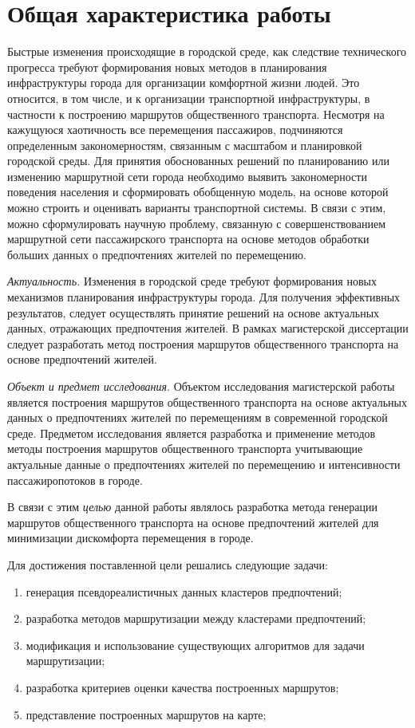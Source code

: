\section{Общая характеристика работы}
Быстрые изменения происходящие в городской среде, как следствие технического прогресса требуют формирования 
новых методов в планирования инфраструктуры города для организации комфортной жизни людей. Это относится, в 
том числе, и к организации транспортной инфраструктуры, в частности к построению маршрутов общественного 
транспорта. Несмотря на кажущуюся хаотичность все перемещения пассажиров, подчиняются определенным 
закономерностям, связанным с масштабом и планировкой городской среды. Для принятия обоснованных решений по 
планированию или изменению маршрутной сети города необходимо выявить закономерности поведения населения и 
сформировать обобщенную модель, на основе которой можно строить и оценивать варианты транспортной системы. 
В связи с этим, можно сформулировать научную проблему, связанную с совершенствованием маршрутной сети 
пассажирского транспорта на основе методов обработки больших данных о предпочтениях жителей по перемещению. 

\emph{Актуальность.} Изменения в городской среде требуют формирования новых механизмов планирования 
инфраструктуры города. Для получения эффективных результатов, следует осуществлять принятие решений на основе 
актуальных данных, отражающих предпочтения жителей. В рамках магистерской диссертации следует разработать 
метод построения маршрутов общественного транспорта на основе предпочтений жителей.

\emph{Объект и предмет исследования}. Объектом исследования магистерской работы является построения маршрутов 
общественного транспорта на основе актуальных данных о предпочтениях жителей по перемещениям в современной 
городской среде. Предметом исследования является разработка и применение методов методы построения маршрутов 
общественного транспорта учитывающие актуальные данные о предпочтениях жителей по перемещению и интенсивности 
пассажиропотоков в городе.

В связи с этим \emph{целью} данной работы являлось разработка метода генерации маршрутов общественного 
транспорта на основе предпочтений жителей для минимизации дискомфорта перемещения в городе.

Для достижения поставленной цели решались следующие задачи:
\vspace*{-1em}
\begin{enumerate}\itemsep-5pt
    \item генерация псевдореалистичных данных кластеров предпочтений;
    \item разработка методов маршрутизации между кластерами предпочтений;
    \item модификация и использование существующих алгоритмов для задачи маршрутизации;
    \item разработка критериев оценки качества построенных маршрутов;
    \item представление построенных маршрутов на карте;
\end{enumerate}

